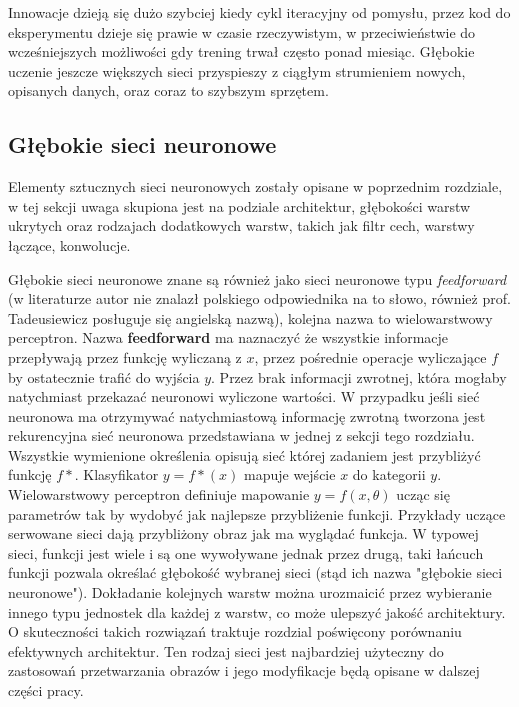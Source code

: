 \documentclass[12pt,a4paper,twoside,titlepage,openright]{book}
\begin{document}
Innowacje dzieją się dużo szybciej kiedy cykl iteracyjny od pomysłu, przez kod do eksperymentu dzieje się prawie w czasie rzeczywistym, w przeciwieństwie do wcześniejszych możliwości gdy trening trwał często ponad miesiąc. Głębokie uczenie jeszcze większych sieci przyspieszy z ciągłym strumieniem nowych, opisanych danych, oraz coraz to szybszym sprzętem.

\subsection{Głębokie sieci neuronowe}
Elementy sztucznych sieci neuronowych zostały opisane w poprzednim rozdziale, w tej sekcji uwaga skupiona jest na podziale architektur, głębokości warstw ukrytych oraz rodzajach dodatkowych warstw, takich jak filtr cech, warstwy łączące, konwolucje.

Głębokie sieci neuronowe znane są również jako sieci neuronowe typu \textit{feedforward} (w literaturze autor nie znalazł polskiego odpowiednika na to słowo, również prof. Tadeusiewicz posługuje się angielską nazwą), kolejna nazwa to wielowarstwowy perceptron. Nazwa \textbf{feedforward} ma naznaczyć że wszystkie informacje przepływają przez funkcję wyliczaną z \(x\), przez pośrednie operacje wyliczające \(f\) by ostatecznie trafić do wyjścia \(y\). Przez brak informacji zwrotnej, która mogłaby natychmiast przekazać neuronowi wyliczone wartości. W przypadku jeśli sieć neuronowa ma otrzymywać natychmiastową informację zwrotną tworzona jest rekurencyjna sieć neuronowa przedstawiana w jednej z sekcji tego rozdziału. Wszystkie wymienione określenia opisują sieć której zadaniem jest przybliżyć funkcję \(f*\). Klasyfikator \(y = f*(x) \) mapuje wejście \(x\) do kategorii \(y\). Wielowarstwowy perceptron definiuje mapowanie \(y = f(x,\theta)\) ucząc się parametrów \theta tak by wydobyć jak najlepsze przybliżenie funkcji. Przykłady uczące serwowane sieci dają przybliżony obraz jak ma wyglądać funkcja. W typowej sieci, funkcji jest wiele i są one wywoływane jednak przez drugą, taki łańcuch funkcji pozwala określać głębokość wybranej sieci (stąd ich nazwa "głębokie sieci neuronowe"). Dokładanie kolejnych warstw można urozmaicić przez wybieranie innego typu jednostek dla każdej z warstw, co może ulepszyć jakość architektury. O skuteczności takich rozwiązań traktuje rozdzial poświęcony porównaniu efektywnych architektur. Ten rodzaj sieci jest najbardziej użyteczny do zastosowań przetwarzania obrazów i jego modyfikacje będą opisane w dalszej części pracy.
\end{document}
